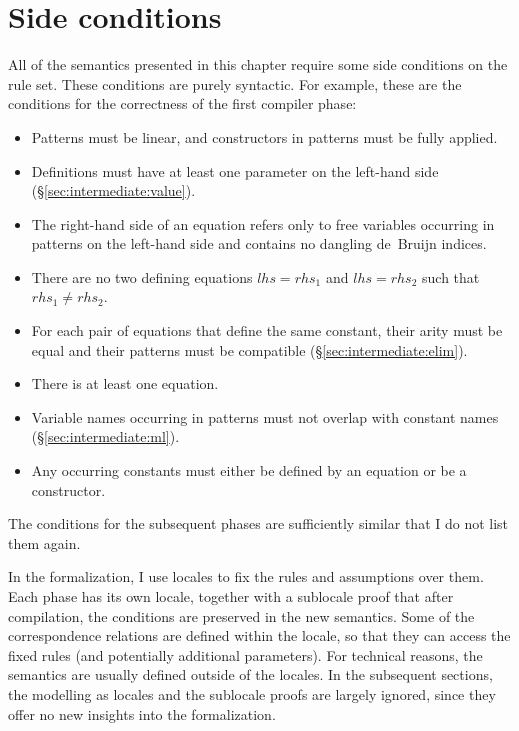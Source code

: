 
\section{Side conditions}
\label{sec:intermediate:wellformed}

All of the semantics presented in this chapter require some side conditions on the rule set.
These conditions are purely syntactic.
For example, these are the conditions for the correctness of the first compiler phase:

\begin{itemize}
  \item Patterns must be linear, and constructors in patterns must be fully applied.
  \item Definitions must have at least one parameter on the left-hand side (§\ref{sec:intermediate:value}).
  \item The right-hand side of an equation refers only to free variables occurring in patterns on the left-hand side and contains no dangling de~Bruijn indices.
  \item There are no two defining equations $\mathit{lhs} = \mathit{rhs}_1$ and $\mathit{lhs} = \mathit{rhs}_2$ such that $\mathit{rhs}_1 \neq \mathit{rhs}_2$.
  \item For each pair of equations that define the same constant, their arity must be equal and their patterns must be compatible (§\ref{sec:intermediate:elim}).
  \item There is at least one equation.
  \item Variable names occurring in patterns must not overlap with constant names (§\ref{sec:intermediate:ml}).
  \item Any occurring constants must either be defined by an equation or be a constructor.
\end{itemize}

\noindent
The conditions for the subsequent phases are sufficiently similar that I do not list them again.

In the formalization, I use locales to fix the rules and assumptions over them.
Each phase has its own locale, together with a sublocale proof that after compilation, the conditions are preserved in the new semantics.
Some of the correspondence relations are defined within the locale, so that they can access the fixed rules (and potentially additional parameters).
For technical reasons, the semantics are usually defined outside of the locales.
In the subsequent sections, the modelling as locales and the sublocale proofs are largely ignored, since they offer no new insights into the formalization.